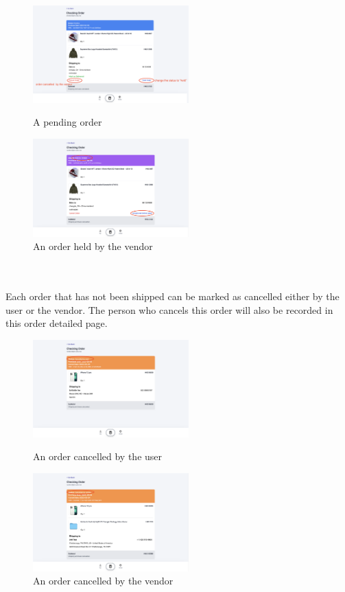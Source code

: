 \documentclass{article}
\begin{document}
\begin{figure}[htbp]
\centering
\begin{minipage}[t]{0.48\textwidth}
\centering
\includegraphics[width=6cm]{pending.png}
\caption{A pending order}
\end{minipage}
\begin{minipage}[t]{0.48\textwidth}
\centering
\includegraphics[width=6cm]{held by vendor.png}
\caption{An order held by the vendor}
\end{minipage}
\end{figure}
\\\\
Each order that has not been shipped can be marked as cancelled either by the user or the vendor. The person who cancels this order will also be recorded in this order detailed page.
\begin{figure}[htbp]
\centering
\begin{minipage}[t]{0.48\textwidth}
\centering
\includegraphics[width=6cm]{cancelled by user.png}
\caption{An order cancelled by the user}
\end{minipage}
\begin{minipage}[t]{0.48\textwidth}
\centering
\includegraphics[width=6cm]{cancelled by vendor.png}
\caption{An order cancelled by the vendor}
\end{minipage}
\end{figure}
\end{document}
